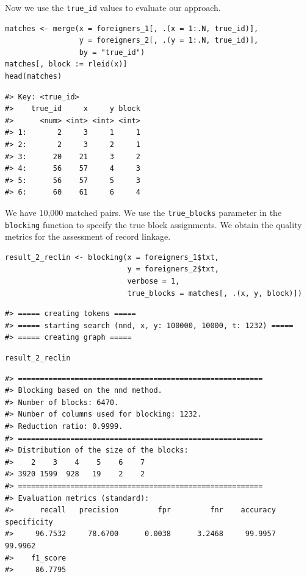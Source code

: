 Now we use the \texttt{true\_id} values to evaluate our approach.

\begin{verbatim}
matches <- merge(x = foreigners_1[, .(x = 1:.N, true_id)],
                 y = foreigners_2[, .(y = 1:.N, true_id)],
                 by = "true_id")
matches[, block := rleid(x)]
head(matches)
\end{verbatim}

\begin{verbatim}
#> Key: <true_id>
#>    true_id     x     y block
#>      <num> <int> <int> <int>
#> 1:       2     3     1     1
#> 2:       2     3     2     1
#> 3:      20    21     3     2
#> 4:      56    57     4     3
#> 5:      56    57     5     3
#> 6:      60    61     6     4
\end{verbatim}

We have 10,000 matched pairs. We use the \texttt{true\_blocks} parameter in the \texttt{blocking} function to specify the true block assignments. We obtain the quality metrics for the assessment of record linkage.

\begin{verbatim}
result_2_reclin <- blocking(x = foreigners_1$txt,
                            y = foreigners_2$txt,
                            verbose = 1,
                            true_blocks = matches[, .(x, y, block)])
\end{verbatim}

\begin{verbatim}
#> ===== creating tokens =====
#> ===== starting search (nnd, x, y: 100000, 10000, t: 1232) =====
#> ===== creating graph =====
\end{verbatim}

\begin{verbatim}
result_2_reclin
\end{verbatim}

\begin{verbatim}
#> ========================================================
#> Blocking based on the nnd method.
#> Number of blocks: 6470.
#> Number of columns used for blocking: 1232.
#> Reduction ratio: 0.9999.
#> ========================================================
#> Distribution of the size of the blocks:
#>    2    3    4    5    6    7 
#> 3920 1599  928   19    2    2 
#> ========================================================
#> Evaluation metrics (standard):
#>      recall   precision         fpr         fnr    accuracy specificity 
#>     96.7532     78.6700      0.0038      3.2468     99.9957     99.9962 
#>    f1_score 
#>     86.7795
\end{verbatim}

